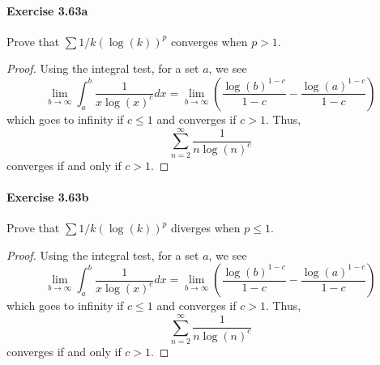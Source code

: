 \documentclass{article}
\begin{document}
\paragraph{Exercise 3.63a} Prove that $\sum 1/k(\log(k))^p$ converges when $p > 1$.
\begin{proof}
    Using the integral test, for a set $a$, we see
$$
\lim _{b \rightarrow \infty} \int_a^b \frac{1}{x \log (x)^c} d x=\lim _{b \rightarrow \infty}\left(\frac{\log (b)^{1-c}}{1-c}-\frac{\log (a)^{1-c}}{1-c}\right)
$$
which goes to infinity if $c \leq 1$ and converges if $c>1$. Thus,
$$
\sum_{n=2}^{\infty} \frac{1}{n \log (n)^c}
$$
converges if and only if $c>1$. 
\end{proof}



\paragraph{Exercise 3.63b} Prove that $\sum 1/k(\log(k))^p$ diverges when $p \leq 1$.
\begin{proof} 
    Using the integral test, for a set $a$, we see
$$
\lim _{b \rightarrow \infty} \int_a^b \frac{1}{x \log (x)^c} d x=\lim _{b \rightarrow \infty}\left(\frac{\log (b)^{1-c}}{1-c}-\frac{\log (a)^{1-c}}{1-c}\right)
$$
which goes to infinity if $c \leq 1$ and converges if $c>1$. Thus,
$$
\sum_{n=2}^{\infty} \frac{1}{n \log (n)^c}
$$
converges if and only if $c>1$. 
\end{proof}
\end{document}
